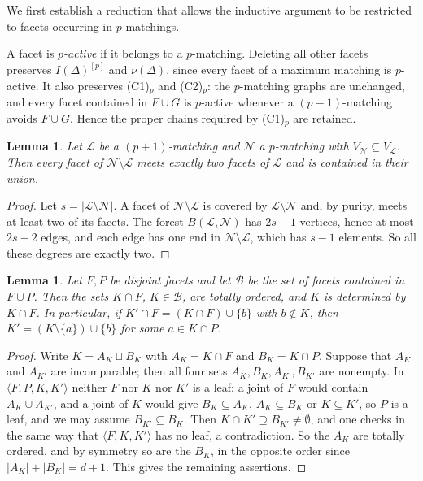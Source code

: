 \documentclass{amsart}
\newtheorem{Lemma}[Theorem]{Lemma}
\theoremstyle{definition}
\theoremstyle{remark}
\begin{document}
We first establish a reduction that allows the inductive argument to
be restricted to facets occurring in $p$-matchings.

A facet is {\em $p$-active} if it belongs to a $p$-matching.
Deleting all other facets preserves $I(\Delta)^{[p]}$ and
$\nu(\Delta)$, since every facet of a maximum matching is $p$-active.
It also preserves \textnormal{(C1)$_p$} and \textnormal{(C2)$_p$}:
the $p$-matching graphs are unchanged, and every facet contained in
$F\cup G$ is $p$-active whenever a $(p-1)$-matching avoids $F\cup G$.
Hence the proper chains required by \textnormal{(C1)$_p$} are retained.




\begin{Lemma}\label{lem:two-facets}
Let $\mathcal L$ be a $(p+1)$-matching and $\mathcal N$ a $p$-matching with $V_{\mathcal N}\subseteq V_{\mathcal L}$. Then every facet of $\mathcal N\setminus\mathcal L$ meets exactly two facets of $\mathcal L$ and is contained in their union.
\end{Lemma}
\begin{proof}
Let $s=|\mathcal L\setminus\mathcal N|$. A facet of $\mathcal N\setminus\mathcal L$ is covered by $\mathcal L\setminus\mathcal N$ and, by purity, meets at least two of its facets. The forest $B(\mathcal L,\mathcal N)$ has $2s-1$ vertices, hence at most $2s-2$ edges, and each edge has one end in $\mathcal N\setminus\mathcal L$, which has $s-1$ elements. So all these degrees are exactly two.
\end{proof}



\begin{Lemma}\label{lem:bridge}
Let $F,P$ be disjoint facets and let $\mathcal B$ be the set of facets contained in $F\cup P$. Then the sets $K\cap F$, $K\in\mathcal B$, are totally ordered, and $K$ is determined by $K\cap F$. In particular, if $K'\cap F=(K\cap F)\cup\{b\}$ with $b\notin K$, then $K'=(K\setminus\{a\})\cup\{b\}$ for some $a\in K\cap P$.
\end{Lemma}

\begin{proof}
Write $K=A_K\sqcup B_K$ with $A_K=K\cap F$ and $B_K=K\cap P$. Suppose that $A_K$ and $A_{K'}$ are incomparable; then all four sets $A_K,B_K,A_{K'},B_{K'}$ are nonempty. In $\langle F,P,K,K'\rangle$ neither $F$ nor $K$ nor $K'$ is a leaf: a joint of $F$ would contain $A_K\cup A_{K'}$, and a joint of $K$ would give $B_K\subseteq A_K$, $A_K\subseteq B_K$ or $K\subseteq K'$, so $P$ is a leaf, and we may assume $B_{K'}\subseteq B_K$. Then $K\cap K'\supseteq B_{K'}\neq\emptyset$, and one checks in the same way that $\langle F,K,K'\rangle$ has no leaf, a contradiction. So the $A_K$ are totally ordered, and by symmetry so are the $B_K$, in the opposite order since $|A_K|+|B_K|=d+1$. This gives the remaining assertions.
\end{proof}
\end{document}
